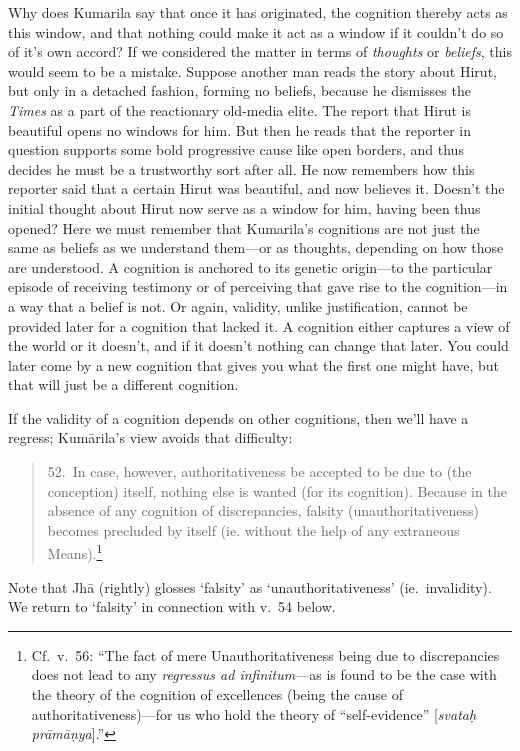 ﻿\documentclass[11pt]{amsart}
\begin{document}
Why does Kumarila say that once it has originated, the cognition thereby acts as this window, and that nothing could make it act as a window if it couldn't do so of it's own accord? If we considered the matter in terms of \emph{thoughts} or \emph{beliefs}, this would seem to be a mistake. Suppose another man reads the story about Hirut, but only in a detached fashion, forming no beliefs, because he dismisses the \emph{Times} as a part of the reactionary old-media elite. The report that Hirut is beautiful opens no windows for him. But then he reads that the reporter in question supports some bold progressive cause like open borders, and thus decides he must be a trustworthy sort after all. He now remembers how this reporter said that a certain Hirut was beautiful, and now believes it. Doesn't the initial thought about Hirut now serve as a window for him, having been thus opened? Here we must remember that Kumarila's cognitions are not just the same as beliefs as we understand them---or as thoughts, depending on how those are understood. A cognition is anchored to its genetic origin---to the particular episode of receiving testimony or of perceiving that gave rise to the cognition---in a way that a belief is not. Or again, validity, unlike justification, cannot be provided later for a cognition that lacked it. A cognition either captures a view of the world or it doesn't, and if it doesn't nothing can change that later. You could later come by a new cognition that gives you what the first one might have, but that will just be a different cognition.

If the validity of a cognition depends on other cognitions, then we'll have a regress; Kum\=arila's view avoids that difficulty:\small\begin{quote}52.~In case, however, authoritativeness be accepted to be due to (the conception) itself, nothing else is wanted (for its cognition). Because in the absence of any cognition of discrepancies, falsity (unauthoritativeness) becomes precluded by itself (ie. without the help of any extraneous Means).\footnote{Cf.~v.~56: ``The fact of mere Unauthoritativeness being due to discrepancies does not lead to any \emph{regressus ad infinitum}---as is found to be the case with the theory of the cognition of excellences (being the cause of authoritativeness)---for us who hold the theory of ``self-evidence'' [\emph{svata\d h pr\=am\=a\d nya}].''}\end{quote}\normalsize Note that Jh\=a (rightly) glosses `falsity' as `unauthoritativeness' (ie.~invalidity). We return to `falsity' in connection with v.~54 below.
\end{document}
